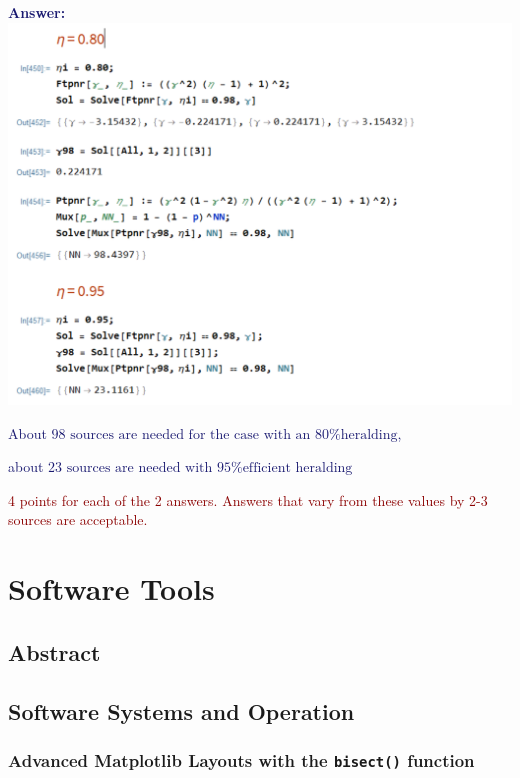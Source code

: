 \documentclass[11pt]{caltech_thesis} %
\begin{document}
\begin{enumerate}
  \textcolor{midnightblue}{ \textbf{Answer:} }
  \textcolor{midnightblue}{\includegraphics{chapter_05/figs_05/pnrTotalPerf.PNG}}

  \textcolor{midnightblue}{About
  \(\boxed{\text{98 sources are needed for the case with an 80\% heralding}}\),
  }

  \textcolor{midnightblue}{about
  \(\boxed{\text{23 sources are needed with 95\% efficient heralding}}\)}

  \textcolor{darkred}{ 4 points for each of the 2 answers. Answers that
  vary from these values by 2-3 sources are acceptable. }
\end{enumerate}

\hypertarget{software-tools}{%
\chapter{Software Tools}\label{software-tools}}

\hypertarget{abstract-4}{%
\section{Abstract}\label{abstract-4}}

\hypertarget{software-systems-and-operation}{%
\section{Software Systems and
Operation}\label{software-systems-and-operation}}

\hypertarget{advanced-matplotlib-layouts-with-the-bisect-function}{%
\subsection{\texorpdfstring{Advanced Matplotlib Layouts with the
\texttt{bisect()}
function}{Advanced Matplotlib Layouts with the bisect() function}}\label{advanced-matplotlib-layouts-with-the-bisect-function}}
\end{document}
